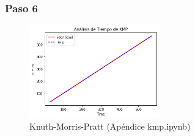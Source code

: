 \subsubsection*{Paso 6}

\begin{figure} [H]
    \includegraphics[width=0.5\textwidth]{../codigoPythonJupyter/kmp/Final.png}
    \caption{Knuth-Morris-Pratt (Apéndice kmp.ipynb)}
    \label{fig:kmp}
\end{figure}




